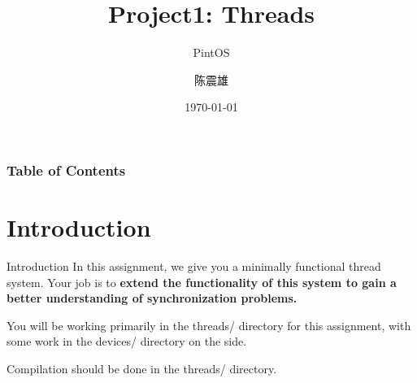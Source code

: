 \documentclass{beamer}
\author{陈震雄}
\title{Project1: Threads}
\subtitle{PintOS}
\institute{武汉大学}
\date{\today}
\begin{document}
\frame{\titlepage}

\begin{frame}
    \frametitle{Table of Contents}
    \tableofcontents
\end{frame}
\section{Introduction}
\begin{frame}[fragile]{Introduction}
    In this assignment, we give you a minimally functional thread system. Your job is to \textbf{extend the functionality of this system to gain a better understanding of synchronization problems.}

You will be working primarily in the threads/ directory for this assignment, with some work in the devices/ directory on the side.

Compilation should be done in the threads/ directory.
\end{frame}
\end{document}
